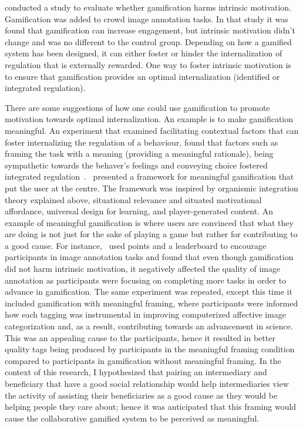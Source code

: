 \cite{mekler2013points} conducted a study to evaluate whether gamification harms intrinsic motivation. Gamification was added to crowd image annotation tasks. In that study it was found that gamification can increase engagement, but intrinsic motivation didn't change and was no different to the control group. Depending on how a gamified system has been designed, it can either foster or hinder the internalization of regulation that is externally rewarded. One way to foster intrinsic motivation is to ensure that gamification provides an optimal internalization (identified or integrated regulation).

There are some suggestions of how one could use gamification to promote motivation towards optimal internalization. An example is to make gamification meaningful. An experiment that examined facilitating contextual factors that can foster internalizing the regulation of a behaviour, found that factors such as framing the task with a meaning (providing a meaningful rationale), being sympathetic towards the behaver's  feelings and conveying choice fostered integrated regulation~\citep{deci1994facilitating}.~\cite{nicholson2012user} presented a framework for meaningful gamification that put the user at the centre. The framework was inspired by organismic integration theory explained above, situational relevance and situated motivational affordance, universal design for learning, and player-generated content. An example of meaningful gamification is where users are convinced that what they are doing is not just for the sake of playing a game but rather for contributing to a good cause. For instance,~\cite{mekler2013points} used points and a leaderboard to encourage participants in image annotation tasks and found that even though gamification did not harm intrinsic motivation, it negatively affected the quality of image annotation as participants were focusing on completing more tasks in order to advance in gamification. The same experiment was repeated, except this time it included gamification with meaningful framing, where participants were informed how each tagging was instrumental in improving computerized affective image categorization and, as a result, contributing towards an advancement in science. This was an appealing cause to the participants, hence it resulted in better quality tags being produced by participants in the meaningful framing condition~\citep{mekler2013disassembling} compared to participants in gamification without meaningful framing. In the context of this research, I hypothesized that pairing an intermediary and beneficiary that have a good social relationship would help intermediaries view the activity of assisting their beneficiaries as a good cause as they would be helping people they care about; hence it was anticipated that this framing would cause the collaborative gamified system to be perceived as meaningful.

